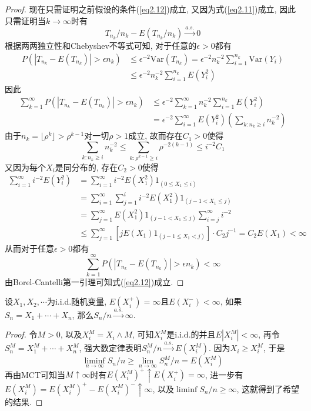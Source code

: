 \documentclass[cn, 12pt, math=mtpro2, bibstyle=apa, blue, twocol]{elegantbook}
\newcommand{\limn}{\lim_{n\to\infty}}
\begin{document}
\begin{proof}
  现在只需证明之前假设的条件(\ref{eq2.12})成立, 又因为式(\ref{eq2.11})成立, 因此只需证明当$k\to\infty$时有
  \begin{equation}\label{eq2.13}
    T_{n_k}/n_k-E(T_{n_k}/n_k)\xrightarrow{a.s.} 0
  \end{equation}
  根据两两独立性和Chebyshev不等式可知, 对于任意的$\epsilon>0$都有
  \begin{align*}
  P(|T_{n_k}-E(T_{n_k})|>\epsilon n_k)&\leq \epsilon^{-2}\text{Var}(T_{n_k})=\epsilon^{-2}n_k^{-2}\sum_{i=1}^{n_k}\text{Var}(Y_i) \\
  &\leq \epsilon^{-2}n_k^{-2}\sum_{i=1}^{n_k}E(Y_i^2)
  \end{align*}
  因此
  \begin{align*}
  \sum_{k=1}^{\infty}P(|T_{n_k}-E(T_{n_k})|>\epsilon n_k)&\leq \epsilon^{-2}\sum_{k=1}^{\infty}n_k^{-2}\sum_{i=1}^{n_k}E(Y_i^2) \\
  &=\epsilon^{-2}\sum_{i=1}^{\infty}E(Y_i^2)\left(\sum_{k:n_k\geq i}n_k^{-2}\right)
  \end{align*}
  由于$n_k=\lfloor\rho^k\rfloor>\rho^{k-1}$对一切$\rho>1$成立, 故而存在$C_1>0$使得
  $$\sum_{k:n_k\geq i}n_k^{-2}\leq\sum_{k:\rho^{k-1}\geq i}\rho^{-2(k-1)}\leq i^{-2}C_1$$
  又因为每个$X_i$是同分布的, 存在$C_2>0$使得
  \begin{align*}
  \sum_{i=1}^{\infty}i^{-2}E(Y_i^2)&=\sum_{i=1}^{\infty}i^{-2}E(X_1^2)1_{(0\leq X_1\leq i)} \\
  &=\sum_{i=1}^{\infty}\sum_{j=1}^{i}i^{-2}E(X_1^2)1_{(j-1<X_1\leq j)} \\
  &=\sum_{j=1}^{\infty}E(X_1^2)1_{(j-1<X_1\leq j)}\sum_{i=j}^{\infty}i^{-2} \\
  &\leq \sum_{j=1}^{\infty}[jE(X_1)1_{(j-1\leq X_1<j)}]\cdot C_2j^{-1}=C_2E(X_1)<\infty
  \end{align*}
  从而对于任意$\epsilon>0$都有
  $$\sum_{k=1}^{\infty}P(|T_{n_k}-E(T_{n_k})|>\epsilon n_k)<\infty$$
  由Borel-Cantelli第一引理可知式(\ref{eq2.12})成立.

\end{proof}
\begin{theorem}\label{thm:thm2.9}
  设$X_1,X_2,\cdots$为i.i.d.随机变量, $E(X_i^+)=\infty$且$E(X_i^-)<\infty$, 如果$S_n=X_1+\cdots+X_n$, 那么$S_n/n\xrightarrow{a.s.}\infty$.
\end{theorem}
\begin{proof}
  令$M>0$, 以及$X_i^M=X_i\wedge M$, 可知$X_i^M$是i.i.d.的并且$E|X_i^M|<\infty$, 再令$S_n^M=X_1^M+\cdots+X_n^M$, 强大数定律表明$S_n^M/n\xrightarrow{a.s.}E(X_i^M)$. 因为$X_i\geq X_i^M$, 于是
  $$\liminf_{n\to\infty}S_n/n\geq \limn S_n^M/n=E(X_i^M)$$
  再由MCT可知当$M\uparrow\infty$时有$E(X_i^{M})^+\uparrow E(X_i^+)=\infty$, 进一步有$E(X_i^M)=E(X_i^M)^+-E(X_i^M)^-\uparrow \infty$, 以及$\liminf S_n/n\geq\infty$, 这就得到了希望的结果.
\end{proof}
\end{document}
